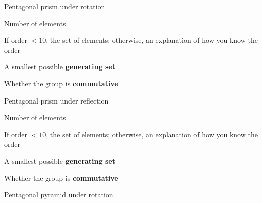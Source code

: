 \documentclass[../gatm_answers.tex]{subfiles}
\begin{document}
\begin{outer_problem}
\item Pentagonal prism under rotation
\end{outer_problem}

\begin{inner_problem}[start=1]
\item Number of elements
\end{inner_problem}

\begin{inner_problem}
\item If order $< 10$, the set of elements; otherwise, an explanation of how you know the order
\end{inner_problem}

\begin{inner_problem}
\item A smallest possible \textbf{generating set}
\end{inner_problem}

\begin{inner_problem}
\item Whether the group is \textbf{commutative}
\end{inner_problem}

\begin{outer_problem}
\item Pentagonal prism under reflection
\end{outer_problem}

\begin{inner_problem}[start=1]
\item Number of elements
\end{inner_problem}

\begin{inner_problem}
\item If order $< 10$, the set of elements; otherwise, an explanation of how you know the order
\end{inner_problem}

\begin{inner_problem}
\item A smallest possible \textbf{generating set}
\end{inner_problem}

\begin{inner_problem}
\item Whether the group is \textbf{commutative}
\end{inner_problem}

\begin{outer_problem}
\item Pentagonal pyramid under rotation
\end{outer_problem}
\end{document}
